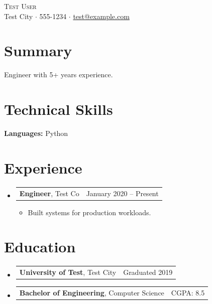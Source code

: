 \documentclass[letterpaper,11pt]{article}
\makeatletter
\newcommand{\resumeItem}[1]{%
  \item\small{#1 \vspace{-1pt}}%
}
\newcommand{\resumeSubheading}[3]{%
  \vspace{2pt}\item
    \begin{tabular*}{\linewidth}[t]{l@{\extracolsep{\fill}}r}
      \textbf{#1}, #2 & #3 \\
    \end{tabular*}\vspace{-4pt}%
}
\newcommand{\resumeSubHeadingListStart}{\begin{itemize}[leftmargin=0.15in, label={}, parsep=0pt, topsep=0pt, itemsep=4pt]}
\newcommand{\resumeSubHeadingListEnd}{\end{itemize}}
\newcommand{\resumeItemListStart}{\begin{itemize}[leftmargin=0.15in, parsep=0pt, topsep=2pt, itemsep=3pt, label=$\bullet$]}
\newcommand{\resumeItemListEnd}{\end{itemize}\vspace{-2pt}}
\makeatother
\begin{document}
\begin{center}
{\Huge \scshape Test User} \\ \vspace{5pt}
\small Test City $\cdot$ 555-1234 $\cdot$ \href{mailto:test@example.com}{test@example.com}
\end{center}

\section{Summary}
{\small Engineer with 5+ years experience.}

\section{Technical Skills}
\begin{itemize}[leftmargin=0.15in, label={}, parsep=0pt, topsep=0pt, itemsep=0pt]
    \small{\item{
     \textbf{Languages:} Python
    }}
\end{itemize}

\section{Experience}
\resumeSubHeadingListStart
\resumeSubheading{Engineer}{Test Co}{January 2020 -- Present}
\resumeItemListStart
\resumeItem{Built systems for production workloads.}
\resumeItemListEnd
\resumeSubHeadingListEnd

\section{Education}
\resumeSubHeadingListStart
\resumeSubheading{University of Test}{Test City}{Graduated 2019}
\vspace{-15pt}
\resumeSubheading{Bachelor of Engineering}{Computer Science}{CGPA: 8.5}
\resumeSubHeadingListEnd
\end{document}
